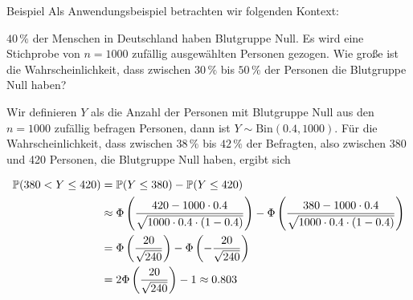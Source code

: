 \begin{colbox}{Beispiel}
    Als Anwendungsbeispiel betrachten wir folgenden Kontext: 

    $40\,\%$ der Menschen in Deutschland haben Blutgruppe Null. Es wird eine Stichprobe von $n=1000$ zufällig 
    ausgewählten Personen gezogen. Wie große ist die Wahrscheinlichkeit, dass zwischen $30\,\%$ bis $50\,\%$ der 
    Personen die Blutgruppe Null haben? 

    Wir definieren $Y$ als die Anzahl der Personen mit Blutgruppe Null aus den $n=1000$ zufällig befragen Personen, dann 
    ist $Y\sim\mathrm{Bin}(0.4, 1000)$. Für die Wahrscheinlichkeit, dass zwischen $38\,\%$ bis $42\,\%$ der Befragten,
    also zwischen 380 und 420 Personen, die Blutgruppe Null haben, ergibt sich
    
    \begin{align*}
        \P(380 < Y \leq 420) 
        &= \P(Y\leq 380) - \P(Y\leq 420) \\
        &\approx \Phi\left(\dfrac{420-1000\cdot0.4}{\sqrt{1000\cdot 0.4\cdot(1-0.4)}}\right)
        - \Phi\left(\dfrac{380-1000\cdot0.4}{\sqrt{1000\cdot 0.4\cdot(1-0.4)}}\right) \\
        &= \Phi\left(\dfrac{20}{\sqrt{240}}\right) - \Phi\left(-\dfrac{20}{\sqrt{240}}\right) \\
        &= 2\Phi\left(\dfrac{20}{\sqrt{240}}\right) - 1 \approx 0.803
    \end{align*}
\end{colbox}

